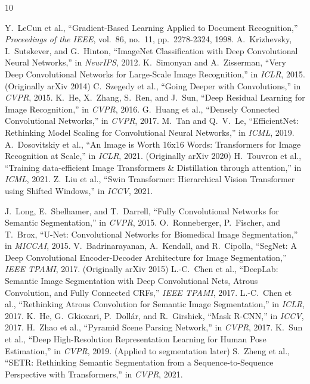 \documentclass{article}
\begin{document}
\begin{thebibliography}{10}

 Y.~LeCun et al., ``Gradient-Based Learning Applied to Document Recognition,'' \textit{Proceedings of the IEEE}, vol.~86, no.~11, pp.~2278-2324, 1998.
 A.~Krizhevsky, I.~Sutskever, and G.~Hinton, ``ImageNet Classification with Deep Convolutional Neural Networks,'' in \textit{NeurIPS}, 2012.
 K.~Simonyan and A.~Zisserman, ``Very Deep Convolutional Networks for Large-Scale Image Recognition,'' in \textit{ICLR}, 2015. (Originally arXiv 2014)
 C.~Szegedy et al., ``Going Deeper with Convolutions,'' in \textit{CVPR}, 2015.
 K.~He, X.~Zhang, S.~Ren, and J.~Sun, ``Deep Residual Learning for Image Recognition,'' in \textit{CVPR}, 2016.
 G.~Huang et al., ``Densely Connected Convolutional Networks,'' in \textit{CVPR}, 2017.
 M.~Tan and Q.~V.~Le, ``EfficientNet: Rethinking Model Scaling for Convolutional Neural Networks,'' in \textit{ICML}, 2019.
 A.~Dosovitskiy et al., ``An Image is Worth 16x16 Words: Transformers for Image Recognition at Scale,'' in \textit{ICLR}, 2021. (Originally arXiv 2020)
 H.~Touvron et al., ``Training data-efficient Image Transformers \& Distillation through attention,'' in \textit{ICML}, 2021.
 Z.~Liu et al., ``Swin Transformer: Hierarchical Vision Transformer using Shifted Windows,'' in \textit{ICCV}, 2021.

 J.~Long, E.~Shelhamer, and T.~Darrell, ``Fully Convolutional Networks for Semantic Segmentation,'' in \textit{CVPR}, 2015.
 O.~Ronneberger, P.~Fischer, and T.~Brox, ``U-Net: Convolutional Networks for Biomedical Image Segmentation,'' in \textit{MICCAI}, 2015.
 V.~Badrinarayanan, A.~Kendall, and R.~Cipolla, ``SegNet: A Deep Convolutional Encoder-Decoder Architecture for Image Segmentation,'' \textit{IEEE TPAMI}, 2017. (Originally arXiv 2015)
 L.-C.~Chen et al., ``DeepLab: Semantic Image Segmentation with Deep Convolutional Nets, Atrous Convolution, and Fully Connected CRFs,'' \textit{IEEE TPAMI}, 2017.
 L.-C.~Chen et al., ``Rethinking Atrous Convolution for Semantic Image Segmentation,'' in \textit{ICLR}, 2017.
 K.~He, G.~Gkioxari, P.~Dollár, and R.~Girshick, ``Mask R-CNN,'' in \textit{ICCV}, 2017.
 H.~Zhao et al., ``Pyramid Scene Parsing Network,'' in \textit{CVPR}, 2017.
 K.~Sun et al., ``Deep High-Resolution Representation Learning for Human Pose Estimation,'' in \textit{CVPR}, 2019. (Applied to segmentation later)
 S.~Zheng et al., ``SETR: Rethinking Semantic Segmentation from a Sequence-to-Sequence Perspective with Transformers,'' in \textit{CVPR}, 2021.


\end{thebibliography}
\end{document}
